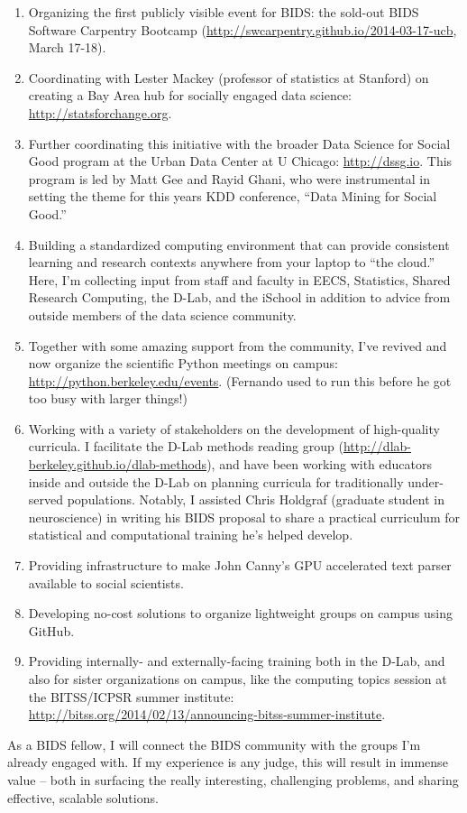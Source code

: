 \begin{enumerate}
    \item Organizing the first publicly visible event for BIDS: the sold-out
        BIDS Software Carpentry Bootcamp
        (\url{http://swcarpentry.github.io/2014-03-17-ucb}, March 17-18).
    \item Coordinating with Lester Mackey (professor of statistics at Stanford)
        on creating a Bay Area hub for socially engaged data science:
        \url{http://statsforchange.org}.
    \item Further coordinating this initiative with the broader Data Science for
        Social Good program at the Urban Data Center at U Chicago:
        \url{http://dssg.io}. This program is led by Matt Gee and Rayid Ghani, who were
        instrumental in setting the theme for this years KDD conference, “Data
        Mining for Social Good.”
    \item Building a standardized computing environment that can provide
        consistent learning and research contexts anywhere from your laptop to
        “the cloud.” Here, I'm collecting input from staff and faculty in EECS,
        Statistics, Shared Research Computing, the D-Lab, and the iSchool in
        addition to advice from outside members of the data science community.
    \item Together with some amazing support from the community, I've revived
        and now organize the scientific Python meetings on campus:
        \url{http://python.berkeley.edu/events}. (Fernando used to run this before he
        got too busy with larger things!)
    \item Working with a variety of stakeholders on the development of
        high-quality curricula. I facilitate the D-Lab methods reading group
        (\url{http://dlab-berkeley.github.io/dlab-methods}), and have been
        working with educators inside and outside the D-Lab on planning
        curricula for traditionally under-served populations. Notably, I
        assisted Chris Holdgraf (graduate student in neuroscience) in writing
        his BIDS proposal to share a practical curriculum for statistical and
        computational training he's helped develop.
    \item Providing infrastructure to make John Canny's GPU accelerated text
        parser available to social scientists.
    \item Developing no-cost solutions to organize lightweight groups on campus
        using GitHub.
    \item Providing internally- and externally-facing training both in the
        D-Lab, and also for sister organizations on campus, like the computing
        topics session at the BITSS/ICPSR summer institute:
        \url{http://bitss.org/2014/02/13/announcing-bitss-summer-institute}.
\end{enumerate}

As a BIDS fellow, I will connect the BIDS community  with the groups I'm already
engaged with. If my experience is any judge, this will result in immense value
-- both in surfacing the really interesting, challenging problems, and sharing
effective, scalable solutions.



